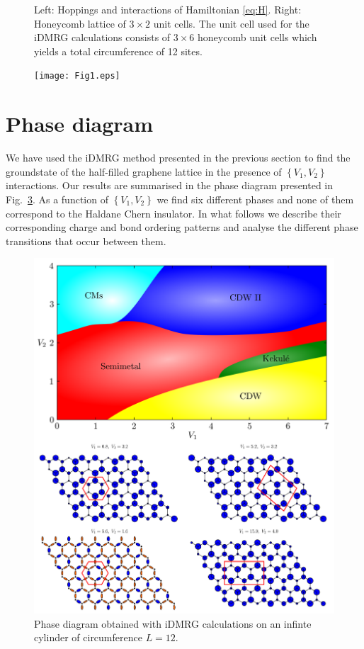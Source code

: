 \documentclass[aps,prx,10pt,twocolumn,floatfix,superscriptaddress,showpacs,numerical,footinbib]{revtex4-1}
\begin{document}
\begin{figure}
 \caption{Left: Hoppings and interactions of Hamiltonian \eqref{eq:H}. Right: Honeycomb lattice of $3 \times 2$ unit cells. The unit cell used for the iDMRG calculations consists of $3 \times 6$ honeycomb unit cells which yields a total circumference of 12 sites. \label{fig:Defs}}
\end{figure}
%
\begin{figure}[tb]
 \texttt{[image: Fig1.eps]}
 \caption{ 
  }
  \label{fig:honeycomblattice}
\end{figure} 
% 
\section{Phase diagram}
%
We have used the iDMRG method presented in the previous section
to find the groundstate of the half-filled graphene lattice in the presence of 
$\left\lbrace V_{1},V_{2}\right\rbrace$ interactions.
%
Our results are summarised in the phase diagram presented in Fig.~\ref{fig:phase diagram}.
%
As a function of $\left\lbrace V_{1},V_{2}\right\rbrace$ we find six different phases and none of them correspond to the Haldane Chern insulator.
%
In what follows we describe their corresponding charge and bond ordering patterns and analyse the different phase transitions that occur between them.
%

\begin{figure}
 \includegraphics[width=\columnwidth]{pdf/phase_diagram.pdf}
 \caption{Phase diagram obtained with iDMRG calculations on an infinte cylinder of circumference $L=12$. \label{fig:phase diagram}}
\end{figure}
\end{document}
